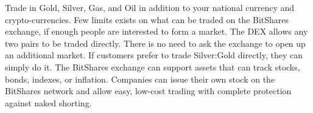 Trade in Gold, Silver, Gas, and Oil in addition to your national currency and
crypto-currencies. Few limits exists on what can be traded on the BitShares
exchange, if enough people are interested to form a market. The DEX allows any
two pairs to be traded directly. There is no need to ask the exchange to open
up an additional market. If customers prefer to trade Silver:Gold directly,
they can simply do it. The BitShares exchange can support assets that can track
stocks, bonds, indexes, or inflation. Companies can issue their own stock on
the BitShares network and allow easy, low-cost trading with complete protection
against naked shorting.
